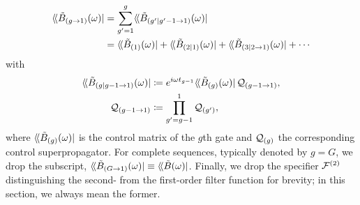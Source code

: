 \begin{align}\label{eq:app:ff:ctrlmat_cumulative}
    \dbra*{\Bt_{(g\to 1)}(\omega)} &= \sum_{g^{\prime}=1}^{g}\dbra*{\Bt_{(g^{\prime}|g^{\prime}-1\to 1)}(\omega)} \\
                                   &= \dbra*{\Bt_{(1)}(\omega)} + \dbra*{\Bt_{(2|1)}(\omega)} + \dbra*{\Bt_{(3|2\to 1)}(\omega)} + \cdots\notag
\end{align}
with
\begin{align}
    \dbra*{\Bt_{(g|g-1\to 1)}(\omega)}
        &\coloneqq \e^{\i\omega t_{g-1}}\dbra*{\Bt_{(g)}(\omega)}\liouvQ_{(g-1\to 1)}, \label{eq:app:ff:ctrlmat_step} \\
    \liouvQ_{(g-1\to 1)}
        &\coloneqq \prod_{g^{\prime}=g-1}^1 \liouvQ_{(g^{\prime})},
\end{align}
where $\dbra*{\Bt_{(g)}(\omega)}$ is the control matrix of the $g$th gate and $\mathcal{Q}_{(g)}$ the corresponding control superpropagator.
For complete sequences, typically denoted by $g = G$, we drop the subscript, $\dbra*{\Bt_{(G\to 1)}(\omega)}\equiv\dbra*{\Bt(\omega)}$.
Finally, we drop the specifier $\mathcal{F}^{(2)}$ distinguishing the second- from the first-order filter function for brevity; in this section, we always mean the former.

